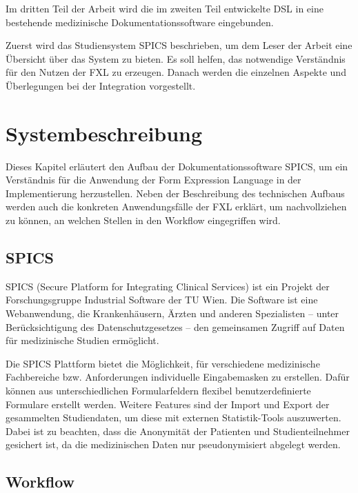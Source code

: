 Im dritten Teil der Arbeit wird die im zweiten Teil entwickelte DSL in eine bestehende medizinische Dokumentationssoftware eingebunden.

Zuerst wird das Studiensystem SPICS beschrieben, um dem Leser der Arbeit eine Übersicht über das System zu bieten. Es soll helfen, das not\-wen\-dige Verständnis für den Nutzen der FXL zu erzeugen. Danach werden die einzelnen Aspekte und Überlegungen bei der Integration vorgestellt.

\chapter{Systembeschreibung}
\label{chapter_systembeschreibung}

Dieses Kapitel erläutert den Aufbau der Dokumentationssoftware SPICS, um ein Verständnis für die Anwendung der Form Expression Language in der Implementierung herzustellen. Neben der Beschreibung des technischen Aufbaus werden auch die konkreten Anwendungsfälle der FXL erklärt, um nachvollziehen zu können, an welchen Stellen in den Workflow eingegriffen wird.


\section{SPICS}

SPICS (Secure Platform for Integrating Clinical Services) ist ein Projekt der  Forschungsgruppe Industrial Software der TU Wien. Die Software ist eine Webanwendung, die Krankenhäusern, Ärzten und anderen Spezialisten -- unter Berücksichtigung des Datenschutzgesetzes -- den gemeinsamen Zugriff auf Daten für medizinische Studien er\-mög\-licht. 

Die SPICS Plattform bietet die Möglichkeit, für verschiedene medizinische Fachbereiche bzw. Anforderungen individuelle Eingabemasken zu erstellen. Dafür können aus unterschiedlichen Formularfeldern flexibel benutzerdefinierte Formulare erstellt werden. Weitere Features sind der Import und Export der gesammelten Studiendaten, um diese mit externen Statistik-Tools auszuwerten. Dabei ist zu beachten, dass die Anonymität der Patienten und Studienteilnehmer gesichert ist, da die medizinischen Daten nur pseudonymisiert abgelegt werden.


\section{Workflow}
\label{section_systembeschreibung_workflow}


